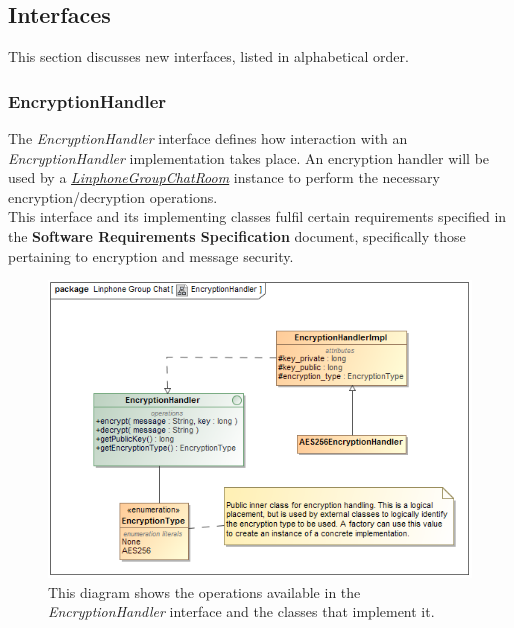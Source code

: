 \documentclass[11pt]{article}
\begin{document}
\subsection{Interfaces}
This section discusses new interfaces, listed in alphabetical order.
\subsubsection{EncryptionHandler}
The \textit{EncryptionHandler} interface defines how interaction with an \textit{EncryptionHandler} implementation takes place. An encryption handler will be used by a \textit{ \hyperref[subsubsec: linphonegroupchatroom]{LinphoneGroupChatRoom}} instance to perform the necessary encryption/decryption operations.\\
This interface and its implementing classes fulfil certain requirements specified in the \textbf{Software Requirements Specification} document, specifically those pertaining to encryption and message security.
\begin{figure}[H]
\centering
\includegraphics[width=5in]{./images/class_encryption_handler.png}
\caption[EncrpytionHandler Class Diagram]{This diagram shows the operations available in the \textit{EncryptionHandler} interface and the classes that implement it.}
\label{cd-encryption-handler}
\end{figure}
\end{document}
